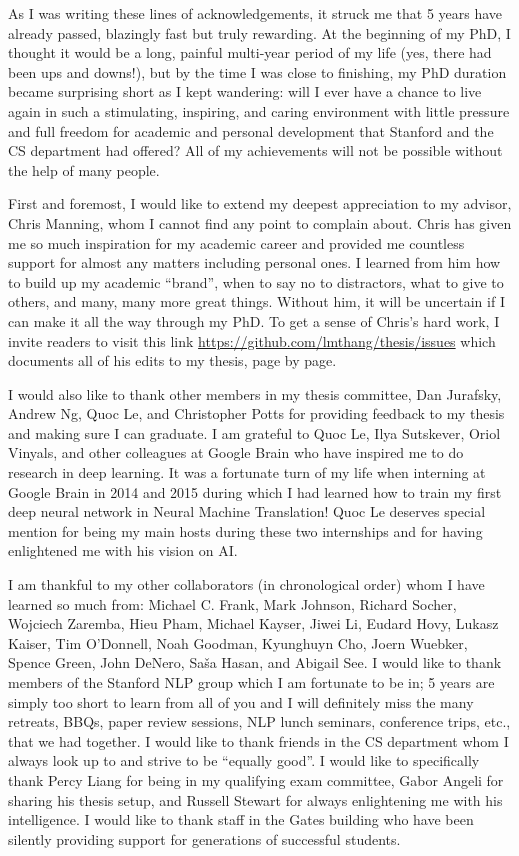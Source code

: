 As I was writing these lines of acknowledgements, it struck me that 5 years have
already passed, blazingly fast but truly rewarding. At the beginning of my PhD,
I thought it would be a long, painful multi-year period of my life (yes, there
had been ups and downs!), but by the time I was close to finishing, my PhD
duration became surprising short as I kept wandering: will I ever have a chance
to live again in such a stimulating, inspiring, and caring environment with
little pressure and full freedom for academic and personal development that
Stanford and the CS department had offered? All of my achievements will not be
possible without the help of many people.

First and foremost, I would like to extend my deepest appreciation to my
advisor, Chris Manning, whom I cannot find any point to complain about. Chris
has given me so much inspiration for my academic career and provided me
countless support for almost any matters including personal ones. I learned from
him how to build up my academic ``brand'', when to say no to distractors,
what to give to others, and many, many more great things.
Without him, it will be uncertain
if I can make it all the way through my PhD. To get a sense of Chris's hard work,
I invite readers to visit this link
\url{https://github.com/lmthang/thesis/issues} which documents all of his edits
to my thesis, page by page.

I would also like to thank other members in my thesis committee, Dan Jurafsky,
Andrew Ng, Quoc Le, and Christopher Potts for providing feedback to my thesis
and making sure I can graduate. I am grateful to Quoc Le, Ilya Sutskever,
Oriol Vinyals, and other colleagues at Google Brain who have inspired me to do
research in deep learning. It was a fortunate turn of my life when interning at
Google Brain in 2014 and 2015 during which I had learned how to train my first
deep neural network in Neural Machine Translation! Quoc Le deserves special
mention for being my main hosts during these two internships and for having
enlightened me with his vision on AI.


I am thankful to my other collaborators (in chronological order) whom I have
learned so much from: Michael C. Frank, Mark Johnson, Richard Socher, Wojciech
Zaremba, Hieu Pham, Michael Kayser, Jiwei Li, Eudard Hovy, Lukasz Kaiser, Tim
O'Donnell, Noah Goodman, Kyunghuyn Cho, Joern Wuebker, Spence Green, John
DeNero, Sa\v{s}a Hasan, and Abigail See. I would like to thank members of the
Stanford NLP group which I am fortunate to be in; 5 years are simply too short
to learn from all of you and I will definitely miss the many retreats, BBQs,
paper review sessions, NLP lunch seminars, conference trips, etc., that we had
together. I would like to thank friends in the CS department whom I always look
up to and strive to be ``equally good''. I would like to specifically thank Percy
Liang for being in my qualifying exam committee, Gabor Angeli for sharing his
thesis setup, and Russell Stewart for always
enlightening me with his intelligence. I would like to thank staff in the Gates
building who have been silently providing support for generations of successful
students.

